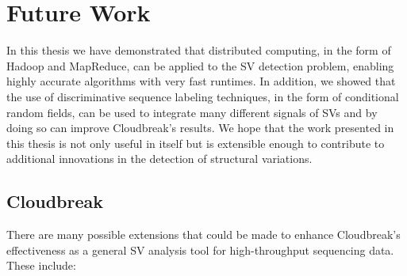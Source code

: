 \chapter{Future Work}\label{chap_future_work}

In this thesis we have demonstrated that distributed computing, in the form of Hadoop and MapReduce, can be applied to the SV detection problem, enabling highly accurate algorithms with very fast runtimes. In addition, we showed that the use of discriminative sequence labeling techniques, in the form of conditional random fields, can be used to integrate many different signals of SVs and by doing so can improve Cloudbreak's results. We hope that the work presented in this thesis is not only useful in itself but is extensible enough to contribute to additional innovations in the detection of structural variations.

\section{Cloudbreak}

There are many possible extensions that could be made to enhance Cloudbreak's effectiveness as a general SV analysis tool for high-throughput sequencing data. These include:

